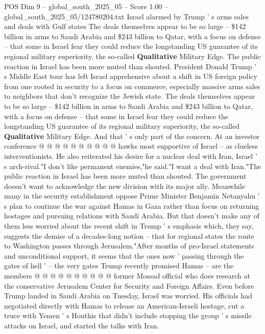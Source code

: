 \begin{textsample}{POS Dim 9 – global\_south\_2025\_05 – Score 1.00 – global\_south\_2025\_05/124780204.txt}  \label{ex:f9_pos_210}
Israel alarmed by Trump ' s arms sales and deals with Gulf states The deals themselves appear to be so large -- \$142 billion in arms to Saudi Arabia and \$243 billion to Qatar, with a focus on defense -- that some in Israel fear they could reduce the longstanding US guarantee of its regional military superiority, the so-called \textbf{Qualitative} Military Edge.
The public reaction in Israel has been more muted than shouted.
President Donald Trump ' s Middle East tour has left Israel apprehensive about a shift in US foreign policy from one rooted in security to a focus on commerce, especially massive arms sales to neighbors that don't recognize the Jewish state.
The deals themselves appear to be so large -- \$142 billion in arms to Saudi Arabia and \$243 billion to Qatar, with a focus on defense -- that some in Israel fear they could reduce the longstanding US guarantee of its regional military superiority, the so-called \textbf{Qualitative} Military Edge.
And that ' s only part of the concern.
At an investor conference @ @ @ @ @ @ @ @ @ @ hawks most supportive of Israel -- as clueless interventionists.
He also reiterated his desire for a nuclear deal with Iran, Israel ' s arch-rival."I don't like permanent enemies,"he said."I want a deal with Iran."The public reaction in Israel has been more muted than shouted.
The government doesn't want to acknowledge the new division with its major ally.
Meanwhile many in the security establishment oppose Prime Minister Benjamin Netanyahu ' s plan to continue the war against Hamas in Gaza rather than focus on returning hostages and pursuing relations with Saudi Arabia.
But that doesn't make any of them less worried about the recent shift in Trump ' s emphasis which, they say, suggests the demise of a decades-long notion -- that for regional states the route to Washington passes through Jerusalem."After months of pro-Israel statements and unconditional support, it seems that the ones now ' passing through the gates of hell ' -- the very gates Trump recently promised Hamas -- are the members @ @ @ @ @ @ @ @ @ @ former Mossad official who does research at the conservative Jerusalem Center for Security and Foreign Affairs.
Even before Trump landed in Saudi Arabia on Tuesday, Israel was worried.
His officials had negotiated directly with Hamas to release an American-Israeli hostage, cut a truce with Yemen ' s Houthis that didn't include stopping the group ' s missile attacks on Israel, and started the talks with Iran.

\end{textsample}

